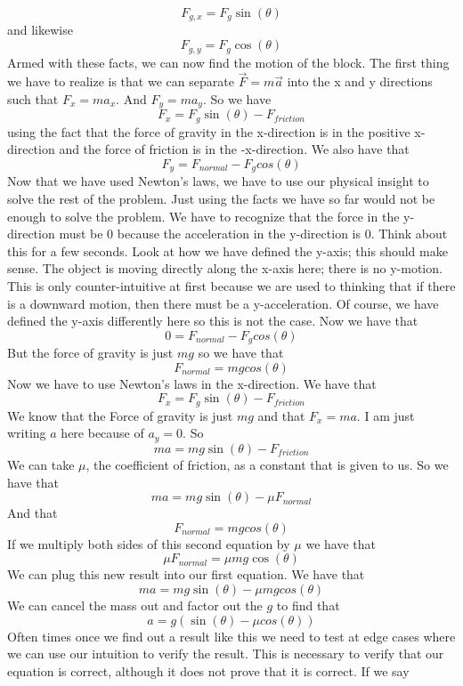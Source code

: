 \begin{equation}F_{g,x}=F_{g}\sin\left(\theta \right)\end{equation} and likewise \begin{equation}F_{g,y}=F_{g}\cos\left(\theta\right)\end{equation} Armed with these facts, we can now find the motion of the block. The first thing we have to realize is that we can separate $\vec{F}=m\vec{a}$ into the x and y directions such that $F_x=ma_x$. And  $F_y=ma_y$.  So we have \begin{equation}F_x= F_{g}\sin\left(\theta\right)-F_{friction}\end{equation} using the fact that the force of gravity in the x-direction is in the positive x-direction and the force of friction is in the -x-direction. We also have that \begin{equation}F_y=F_{normal}-F_{g}cos\left(\theta\right)\end{equation} Now that we have used Newton's laws, we have to use our physical insight to solve the rest of the problem. Just using the facts we have so far would not be enough to solve the problem. We have to recognize that the force in the y-direction must be 0 because the acceleration in the y-direction is 0. Think about this for a few seconds. Look at how we have defined the y-axis; this should make sense. The object is moving directly along the x-axis here; there is no y-motion. This is only counter-intuitive at first because we are used to thinking that if there is a downward motion, then there must be a y-acceleration. Of course, we have defined the y-axis differently here so this is not the case. Now we have that \begin{equation}0=F_{normal}-F_{g}cos\left(\theta\right)\end{equation} But the force of gravity is just $mg$ so we have that $$F_{normal}=mgcos\left(\theta\right)$$ Now we have to use Newton’s laws in the x-direction. We have that  $$F_x=F_{g}\sin\left(\theta \right)-F_{friction}$$ We know that the Force of gravity is just $mg$ and that $F_x=ma$. I am just writing $a$ here because of $a_y=0$. So $$ma=mg\sin\left(\theta \right)-F_{friction}$$ We can take $\mu$, the coefficient of friction, as a constant that is given to us. So we have that $$ma=mg\sin\left(\theta \right)-\mu F_{normal}$$ And that $$F_{normal}=mgcos\left(\theta \right)$$ If we multiply both sides of this second equation by $\mu$ we have that $$\mu F_{normal}=\mu mg\cos\left(\theta \right)$$ We can plug this new result into our first equation. We have that \begin{equation}ma=mg\sin\left(\theta \right)-\mu mgcos\left(\theta \right)\end{equation} We can cancel the mass out and factor out the $g$ to find that \begin{equation}a=g\left(\sin\left(\theta \right)-\mu cos\left(\theta \right)\right)\end{equation}Often times once we find out a result like this we need to test at edge cases where we can use our intuition to verify the result. This is necessary to verify that our equation is correct, although it does not prove that it is correct. If we say 
